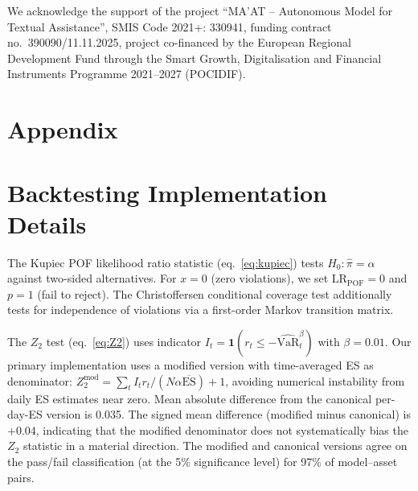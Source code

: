 \documentclass[preprint,11pt,authoryear]{elsarticle}
\newcommand{\VaR}{\mathrm{VaR}}
\newcommand{\ES}{\mathrm{ES}}
\newcommand{\1}{\boldsymbol{1}}
\begin{document}
	We acknowledge the support of the project ``MA'AT -- Autonomous
	Model for Textual Assistance'', SMIS Code 2021+: 330941, funding contract no.\ 390090/11.11.2025, project co-financed by the European Regional Development Fund through the Smart Growth, Digitalisation and Financial Instruments Programme 2021--2027 (POCIDIF).
	
	
	
	
	
	
	
	
	\newpage
	\appendix
	\renewcommand{\thesection}{\Alph{section}}
	
	\section*{Appendix}
	
	\section{Backtesting Implementation Details}
	\label{app:backtesting}
	
	The Kupiec POF likelihood ratio statistic (eq.~\ref{eq:kupiec})
	tests $H_0: \hat\pi = \alpha$ against two-sided alternatives.
	For $x=0$ (zero violations), we set $\mathrm{LR}_{\mathrm{POF}}=0$
	and $p=1$ (fail to reject). The Christoffersen conditional coverage
	test \citep{christoffersen1998} additionally tests for independence
	of violations via a first-order Markov transition matrix.
	
	The $Z_2$ test (eq.~\ref{eq:Z2}) uses indicator
	$I_t = \1(r_t \leq -\widehat{\VaR}_t^\beta)$ with $\beta = 0.01$.
	Our primary implementation uses a modified version with
	time-averaged ES as denominator:
	$Z_2^{\text{mod}} = \sum_t I_t r_t / (N\alpha\overline{\ES}) + 1$,
	avoiding numerical instability from daily ES estimates near zero.
	Mean absolute difference from the canonical per-day-ES version
	is 0.035. The signed mean difference (modified minus canonical) is $+0.04$, indicating that the modified denominator does not systematically bias the $Z_2$ statistic in a material direction. The modified and canonical versions agree on the pass/fail classification (at the 5\% significance level) for 97\% of model--asset pairs.
	
\end{document}
